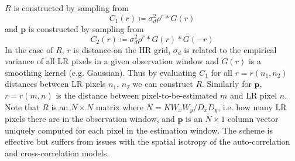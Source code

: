 %
$R$ is constructed by sampling from
\begin{equation}
    C_1(r) \coloneqq \sigma_{d}^2 \rho^{r} \ast G(r)
\end{equation}
and $\bm{p}$ is constructed by sampling from
\begin{equation}
    C_2(r) \coloneqq \sigma_d^2 \rho^{r} \ast G(r) \ast G(-r)
\end{equation}
In the case of $R$, $r$ is distance on the HR grid, $\sigma_d$ is related to the empirical variance of all LR pixels in a given observation window and $G(r)$ is a smoothing kernel (e.g. Gaussian).
%
Thus by evaluating $C_1$ for all $r = r(n_1, n_2)$ distances between LR pixels $n_1$, $n_2$ we can construct $R$.
%
Similarly for $\bm{p}$, $r = r(m, n)$ is the distance between pixel-to-be-estimated $m$ and LR pixel $n$.
%
Note that $R$ is an $N \times N$ matrix where $N = K W_x W_y/D_x D_y$, i.e. how many LR pixels there are in the observation window, and $\bm{p}$ is an $N \times 1$ column vector uniquely computed for each pixel in the estimation window.
%
The scheme is effective but suffers from issues with the spatial isotropy of the auto-correlation and cross-correlation models.
